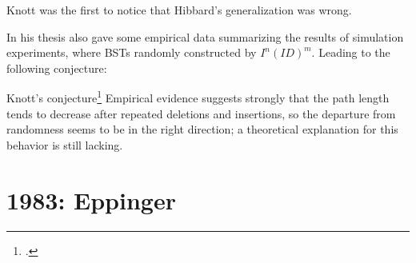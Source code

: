 \documentclass{beamer}
\begin{document}
\begin{frame}
    Knott was the first to notice that Hibbard's generalization was wrong. 

    In his thesis also gave some empirical data summarizing the results of simulation experiments, where BSTs randomly constructed by $I^n(ID)^m$. Leading to the following conjecture:
    \begin{block}{Knott's conjecture}\footcite{knuth1998art}
        Empirical evidence suggests strongly that the path length tends to decrease after repeated deletions and insertions, so the
        departure from randomness seems to be in the right direction; a theoretical explanation for this behavior is still lacking.
    \end{block}
\end{frame}

\section{1983: Eppinger}
\end{document}
